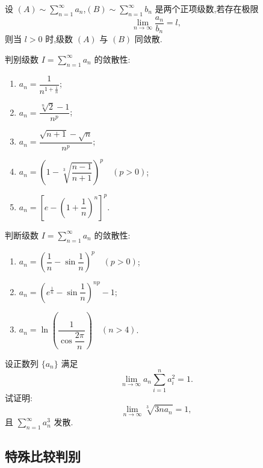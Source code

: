 \documentclass[../../数学分析培优讲义.tex]{subfiles}
\begin{document}

\begin{theorem}
设 $\displaystyle(A)\sim\sum\limits_{n=1}^{\infty}a_n$,$\displaystyle(B)\sim\sum\limits_{n=1}^{\infty}b_n$ 是两个正项级数,若存在极限
\[
    \lim\limits_{n\to\infty}\dfrac{a_n}{b_n}=l,
\]
则当 $l>0$ 时,级数 $(A)$ 与 $(B)$ 同敛散.
\end{theorem}

\begin{example}
判别级数 $\displaystyle I=\sum\limits_{n=1}^{\infty}a_n$ 的敛散性:
\begin{enumerate}[label=(\arabic*)]
    \item $\displaystyle a_n=\dfrac{1}{n^{1+\frac{1}{n}}}$;
    \item $\displaystyle a_n=\dfrac{\sqrt[n]{2}-1}{n^p}$;
    \item $\displaystyle a_n=\dfrac{\sqrt{n+1}-\sqrt n}{n^p}$;
    \item $\displaystyle a_n=\left(1-\sqrt[3]{\dfrac{n-1}{n+1}}\right)^p\quad(p>0)$;
    \item $\displaystyle a_n=\left[e-\left(1+\dfrac{1}{n}\right)^n\right]^p$.
\end{enumerate}
\end{example}
\exampleblank

\begin{example}
判断级数 $\displaystyle I=\sum\limits_{n=1}^{\infty}a_n$ 的敛散性:
\begin{enumerate}[label=(\arabic*)]
    \item $\displaystyle a_n=\left(\dfrac{1}{n}-\sin\dfrac{1}{n}\right)^p\quad(p>0)$;
    \item $\displaystyle a_n=\left(e^{\frac{1}{n}}-\sin\dfrac{1}{n}\right)^{np}-1$;
    \item $\displaystyle a_n=\ln\left(\dfrac{1}{\cos\dfrac{2\pi}{n}}\right)\quad(n>4)$.
\end{enumerate}
\end{example}
\exampleblank

\begin{example}
设正数列 $\{a_n\}$ 满足
\[
    \lim\limits_{n\to\infty}a_n\sum\limits_{i=1}^na_i^2=1.
\]
试证明:
\[
    \lim\limits_{n\to\infty}\sqrt[3]{3na_n}=1,
\]
且 $\displaystyle\sum\limits_{n=1}^{\infty}a_n^3$ 发散.
\end{example}
\exampleblank



\subsection{特殊比较判别}
\end{document}
